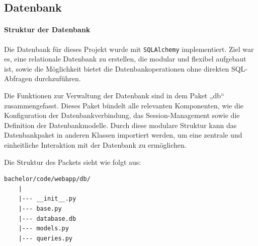 \documentclass[12pt, letterpaper]{article}
\begin{document}
  \subsection{Datenbank}
  \paragraph{Struktur der Datenbank}
  \par \textbf{}
  \par Die Datenbank für dieses Projekt wurde mit \texttt{SQLAlchemy} implementiert. Ziel war es, eine relationale Datenbank zu erstellen, die modular und flexibel aufgebaut ist, sowie die Möglichkeit bietet die Datenbankoperationen ohne direkten SQL-Abfragen durchzuführen.
  \par Die Funktionen zur Verwaltung der Datenbank sind in dem Paket „db“ zusammengefasst. Dieses Paket bündelt alle relevanten Komponenten, wie die Konfiguration der Datenbankverbindung, das Session-Management sowie die Definition der Datenbankmodelle. Durch diese modulare Struktur kann das Datenbankpaket in anderen Klassen importiert werden, um eine zentrale und einheitliche Interaktion mit der Datenbank zu ermöglichen.
  \par Die Struktur des Packets sieht wie folgt aus:
  \begin{Verbatim}[frame=single]
    bachelor/code/webapp/db/
    |
    |--- __init__.py
    |--- base.py
    |--- database.db
    |--- models.py
    |--- queries.py
  \end{Verbatim}
\end{document}
